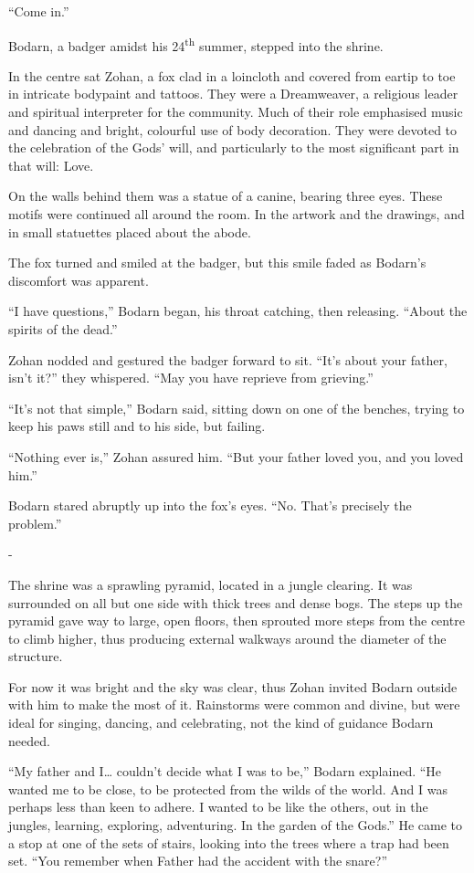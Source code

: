 

``Come in.''

Bodarn, a badger amidst his 24\textsuperscript{th} summer, stepped into the shrine.

In the centre sat Zohan, a fox clad in a loincloth and covered from eartip to toe in intricate bodypaint and tattoos. They were a Dreamweaver, a religious leader and spiritual interpreter for the community. Much of their role emphasised music and dancing and bright, colourful use of body decoration. They were devoted to the celebration of the Gods' will, and particularly to the most significant part in that will: Love.

On the walls behind them was a statue of a canine, bearing three eyes. These motifs were continued all around the room. In the artwork and the drawings, and in small statuettes placed about the abode.

The fox turned and smiled at the badger, but this smile faded as Bodarn's discomfort was apparent.

``I have questions,'' Bodarn began, his throat catching, then releasing. ``About the spirits of the dead.''

Zohan nodded and gestured the badger forward to sit. ``It's about your father, isn't it?'' they whispered. ``May you have reprieve from grieving.''

``It's not that simple,'' Bodarn said, sitting down on one of the benches, trying to keep his paws still and to his side, but failing.

``Nothing ever is,'' Zohan assured him. ``But your father loved you, and you loved him.''

Bodarn stared abruptly up into the fox's eyes. ``No. That's precisely the problem.''

-

The shrine was a sprawling pyramid, located in a jungle clearing. It was surrounded on all but one side with thick trees and dense bogs. The steps up the pyramid gave way to large, open floors, then sprouted more steps from the centre to climb higher, thus producing external walkways around the diameter of the structure.

For now it was bright and the sky was clear, thus Zohan invited Bodarn outside with him to make the most of it. Rainstorms were common and divine, but were ideal for singing, dancing, and celebrating, not the kind of guidance Bodarn needed.

``My father and I\ldots{} couldn't decide what I was to be,'' Bodarn explained. ``He wanted me to be close, to be protected from the wilds of the world. And I was perhaps less than keen to adhere. I wanted to be like the others, out in the jungles, learning, exploring, adventuring. In the garden of the Gods.'' He came to a stop at one of the sets of stairs, looking into the trees where a trap had been set. ``You remember when Father had the accident with the snare?''


